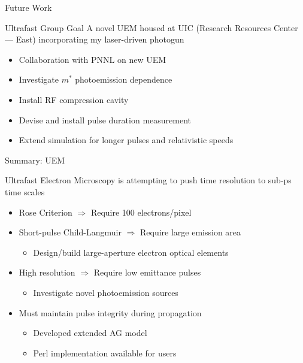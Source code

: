 \begin{frame}{Future Work}
  \begin{block}{Ultrafast Group Goal}
    A novel UEM housed at UIC (Research Resources Center --- East) incorporating my laser-driven photogun
  \end{block}
  \begin{itemize}
    \item<2-> Collaboration with PNNL on new UEM 
    \item<3-> Investigate $m^{*}$ photoemission dependence
    \item<4-> Install RF compression cavity
    \item<5-> Devise and install pulse duration measurement
    \item<6-> Extend simulation for longer pulses and relativistic speeds
  \end{itemize}
\end{frame}

\begin{frame}{Summary: UEM}
\begin{block}{}
  Ultrafast Electron Microscopy is attempting to push time resolution to sub-ps time scales
\end{block}
\begin{itemize}
  \item Rose Criterion $\Rightarrow$ Require 100 electrons/pixel
  \item<2-> Short-pulse Child-Langmuir $\Rightarrow$ Require large emission area
  \begin{itemize}
    \item<2->[$\hookrightarrow$] Design/build large-aperture electron optical elements
  \end{itemize}
  \item<3-> High resolution $\Rightarrow$ Require low emittance pulses
  \begin{itemize}
    \item<3->[$\hookrightarrow$] Investigate novel photoemission sources
  \end{itemize}
  \item<4-> Must maintain pulse integrity during propagation
  \begin{itemize}
    \item<4->[$\hookrightarrow$] Developed extended AG model
    \item<4->[$\hookrightarrow$] Perl implementation available for users
  \end{itemize}
\end{itemize}
\end{frame}

